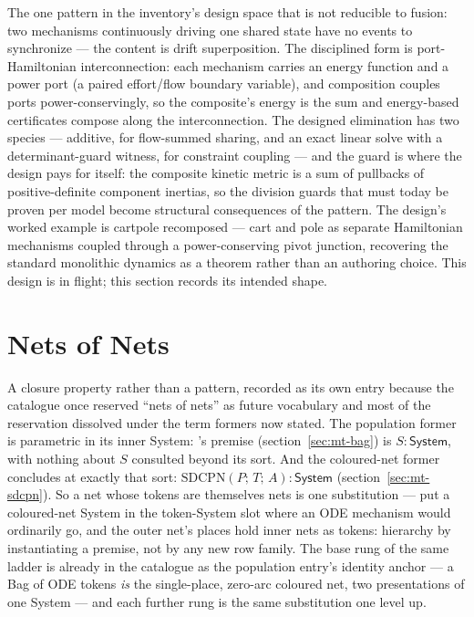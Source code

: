 The one pattern in the inventory's design space that is not reducible
to fusion: two mechanisms continuously driving one shared state have
no events to synchronize --- the content is drift superposition. The
disciplined form is port-Hamiltonian interconnection: each mechanism
carries an energy function and a power port (a paired effort/flow
boundary variable), and composition couples ports
power-conservingly, so the composite's energy is the sum and
energy-based certificates compose along the interconnection. The
designed elimination has two species --- additive, for flow-summed
sharing, and an exact linear solve with a determinant-guard witness,
for constraint coupling --- and the guard is where the design pays
for itself: the composite kinetic metric is a sum of pullbacks of
positive-definite component inertias, so the division guards that
must today be proven per model become structural consequences of the
pattern. The design's worked example is cartpole recomposed --- cart
and pole as separate Hamiltonian mechanisms coupled through a
power-conserving pivot junction, recovering the standard monolithic
dynamics as a theorem rather than an authoring choice. This design is
in flight; this section records its intended shape.



\section{Nets of Nets}
\label{sec:cp-netsofnets}

A closure property rather than a pattern, recorded as its own entry
because the catalogue once reserved ``nets of nets'' as future
vocabulary and most of the reservation dissolved under the term
formers now stated. The population former is parametric in its inner
System: 's premise (section~\ref{sec:mt-bag}) is
$S : \mathsf{System}$, with nothing about $S$ consulted beyond its
sort. And the coloured-net former concludes at exactly that sort:
$\mathrm{SDCPN}(P;\, T;\, A) : \mathsf{System}$
(section~\ref{sec:mt-sdcpn}). So a net whose tokens are themselves
nets is one substitution --- put a coloured-net System in the
token-System slot where an ODE mechanism would ordinarily go, and the
outer net's places hold inner nets as tokens: hierarchy by
instantiating a premise, not by any new row family. The base rung of
the same ladder is already in the catalogue as the population
entry's identity anchor --- a Bag of ODE tokens \emph{is} the
single-place, zero-arc coloured net, two presentations of one System
--- and each further rung is the same substitution one level up.

